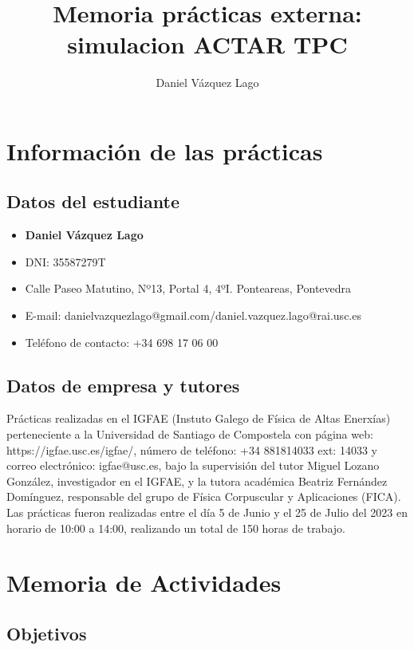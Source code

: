 \documentclass[12pt,a4paper]{article}
\title{Memoria prácticas externa: simulacion ACTAR TPC}
\author{Daniel Vázquez Lago}
\numberwithin{equation}{section}
\numberwithin{figure}{section}
\begin{document}
\maketitle

\newpage

\tableofcontents

\newpage


\section{Información de las prácticas}

\subsection{Datos del estudiante}

\begin{itemize}
    \item {\bf Daniel Vázquez Lago}
    \item DNI: 35587279T
    \item Calle Paseo Matutino, Nº13, Portal 4, 4ºI. Ponteareas, Pontevedra 
    \item E-mail: danielvazquezlago@gmail.com/daniel.vazquez.lago@rai.usc.es 
    \item Teléfono de contacto: +34 698 17 06 00
\end{itemize}

\subsection{Datos de empresa y tutores}

Prácticas realizadas en el IGFAE (Instuto Galego de Física de Altas Enerxías) perteneciente a la Universidad de Santiago de Compostela con página web: https://igfae.usc.es/igfae/, número de teléfono: +34 881814033 ext: 14033 y correo electrónico: igfae@usc.es, bajo la supervisión del tutor Miguel Lozano González, investigador en el IGFAE, y la tutora académica Beatriz Fernández Domínguez, responsable del grupo de Física Corpuscular y Aplicaciones (FICA). Las prácticas fueron realizadas entre el día 5 de Junio y el 25 de Julio del 2023 en horario de 10:00 a 14:00, realizando un total de 150 horas de trabajo.

\section{Memoria de Actividades}

\subsection{Objetivos}
\end{document}
